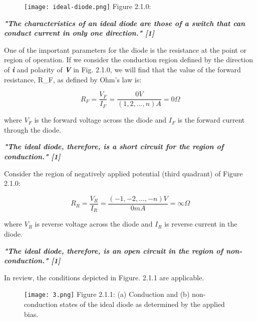 \documentclass[10pt,a4paper]{article}
\begin{document}
\begin{multicols}{2}
\begin{figure}[H]
\texttt{[image: ideal-diode.png]}
\centering \linebreak \linebreak Figure 2.1.0: 
\end{figure}

 \hfill \break \break \break

\textbf{\textit{\Large {"The characteristics of an ideal diode are those of a switch that can conduct current in only one direction." [1] }}} \hfill \break

\end{multicols}

One of the important parameters for the diode is the resistance at the point or region of operation. If we consider the conduction region defined by the direction of \textbf{\textit{i}} and polarity of \textbf{\textit{V}} in Fig. 2.1.0, we will find that the value of the forward resistance, R\_F, as defined by Ohm’s law is:

\begin{equation}
R_{F} = \frac{V_{F}}{ I_{F}} = \frac{0 V}{(1, 2, ..., n) A} = 0 \Omega
\end{equation}

where $V_F$ is the forward voltage across the diode and $I_F$ is the forward current through the diode. \hfill \break \break

\textbf{\textit{\Large {"The ideal diode, therefore, is a short circuit for the region of conduction." [1] }}} \hfill \break

Consider the region of negatively applied potential (third quadrant) of Figure 2.1.0:

\begin{equation}
R_{R} = \frac{V_{R}}{ I_{R}} = \frac{(-1, -2,..., -n)V}{0mA} = \infty \Omega
\end{equation}

where $V_R$ is reverse voltage across the diode and $I_R$ is reverse current in the diode.

\hfill \break \break

\textbf{\textit{\Large {"The ideal diode, therefore, is an open circuit in the region of non-conduction." [1] }}} \hfill \break

\pagebreak

In review, the conditions depicted in Figure. 2.1.1 are applicable.

\begin{figure}[H]
\texttt{[image: 3.png]}
\centering \linebreak \linebreak Figure 2.1.1: (a) Conduction and (b) non-conduction states of the ideal diode as determined by the applied bias.
\end{figure}
\end{document}
